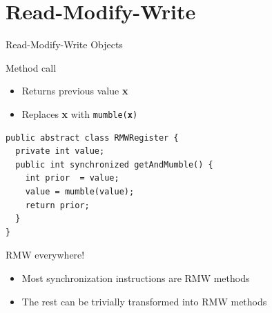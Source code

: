 % 
% 
% 
% 
% 
% 
% 
% 

% 
% 
% 
% 
% 

\section{Read-Modify-Write}
\showTOC

\begin{frame}[fragile]{Read-Modify-Write Objects}

Method call
\begin{itemize}
  \item Returns previous value \textbf{x}
  \item Replaces \textbf{x} with \texttt{mumble(\textbf{x})}
\end{itemize}

\pause
\begin{verbatim}
public abstract class RMWRegister {
  private int value;
  public int synchronized getAndMumble() {
    int prior  = value;
    value = mumble(value);
    return prior;
  }
}
\end{verbatim}

\pause

RMW everywhere!

\begin{itemize}
  \item Most synchronization instructions are RMW methods
  \item The rest can be trivially transformed into RMW methods
\end{itemize}

\end{frame}


